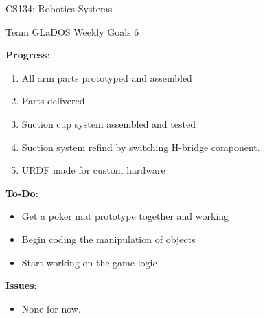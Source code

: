\documentclass[12 pt]{article}
\newcommand{\setnum}{6}
\begin{document}
\begin{center}
    \Large \color{blue} CS134: Robotics Systems\color{black}
    \begin{center}\normalsize Team GLaDOS Weekly Goals \setnum{}\end{center}
    \noindent{\color{black} \rule{\linewidth}{0.5mm} }
\end{center}

\textbf{Progress}:
    \begin{enumerate}
        \item All arm parts prototyped and assembled
        \item Parts delivered
        \item Suction cup system assembled and tested
        \item Suction system refind by switching H-bridge component.
        \item URDF made for custom hardware
    \end{enumerate}

\textbf{To-Do}:
    \begin{itemize}
        \item Get a poker mat prototype together and working
        \item Begin coding the manipulation of objects
        \item Start working on the game logic
    \end{itemize}

\textbf{Issues}:
    \begin{itemize}
        \item None for now.
    \end{itemize}
\end{document}
